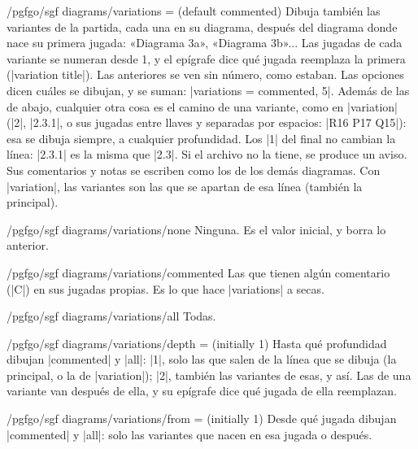 \begin{key}{/pgfgo/sgf diagrams/variations =  (default commented)}
	Dibuja también las variantes de la partida, cada una en su diagrama, después del diagrama donde nace su primera jugada: «Diagrama 3a», «Diagrama 3b»... Las jugadas de cada variante se numeran desde 1, y el epígrafe dice qué jugada reemplaza la primera (|variation title|). Las anteriores se ven sin número, como estaban. Las opciones dicen cuáles se dibujan, y se suman: |variations = {commented, 5}|. Además de las de abajo, cualquier otra cosa es el camino de una variante, como en |variation| (|2|, |2.3.1|, o sus jugadas entre llaves y separadas por espacios: |{R16 P17 Q15}|): esa se dibuja siempre, a cualquier profundidad. Los |1| del final no cambian la línea: |2.3.1| es la misma que |2.3|. Si el archivo no la tiene, se produce un aviso. Sus comentarios y notas se escriben como los de los demás diagramas. Con |variation|, las variantes son las que se apartan de esa línea (también la principal).

	\begin{codeexample}[]
	\end{codeexample}
\end{key}

\begin{stylekey}{/pgfgo/sgf diagrams/variations/none}
	Ninguna. Es el valor inicial, y borra lo anterior.
\end{stylekey}

\begin{stylekey}{/pgfgo/sgf diagrams/variations/commented}
	Las que tienen algún comentario (|C|) en sus jugadas propias. Es lo que hace |variations| a secas.
\end{stylekey}

\begin{stylekey}{/pgfgo/sgf diagrams/variations/all}
	Todas.
\end{stylekey}

\begin{key}{/pgfgo/sgf diagrams/variations/depth =  (initially 1)}
	Hasta qué profundidad dibujan |commented| y |all|: |1|, solo las que salen de la línea que se dibuja (la principal, o la de |variation|); |2|, también las variantes de esas, y así. Las de una variante van después de ella, y su epígrafe dice qué jugada de ella reemplazan.
\end{key}

\begin{key}{/pgfgo/sgf diagrams/variations/from =  (initially 1)}
	Desde qué jugada dibujan |commented| y |all|: solo las variantes que nacen en esa jugada o después.

	\begin{codeexample}
	\end{codeexample}
\end{key}


